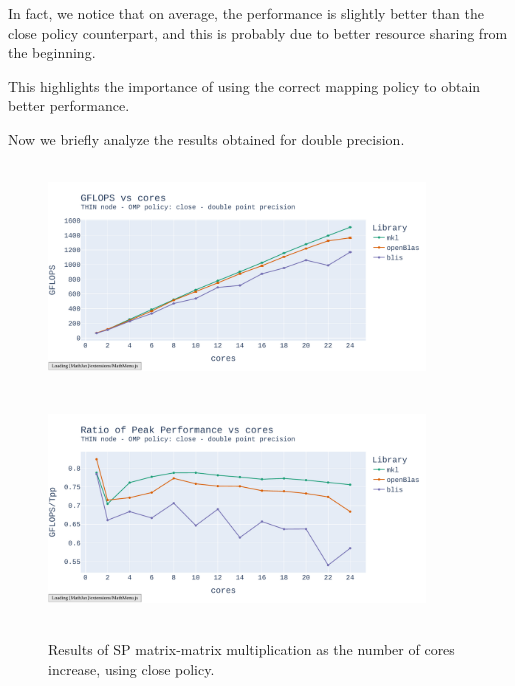 \documentclass{report}
\begin{document}
In fact, we notice that on average, the performance is slightly better than the 
close policy counterpart, and this is probably due to better resource sharing 
from the beginning.

This highlights the importance of using the correct mapping policy to obtain better 
performance.

Now we briefly analyze the results obtained for double precision.
\begin{figure}[h!]
\hspace*{-2.5cm}
\includegraphics[width=10cm, height=6cm]{./images/fixed_size_thin_double_gflops_close.pdf}
\includegraphics[width=10cm, height=6cm]{./images/fixed_size_thin_double_gflops_close_ratio.pdf}
\caption{\label{fig:fixed_size_thin_double_close} Results of SP matrix-matrix multiplication 
    as the number of cores increase, using close policy.}
\end{figure}
\end{document}
